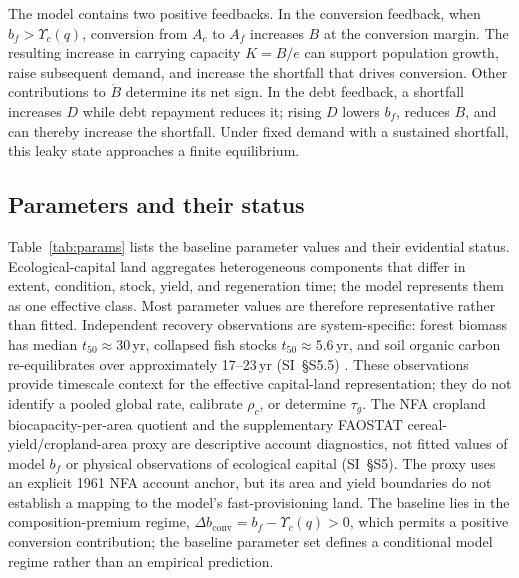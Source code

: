 \documentclass[preprint,12pt,authoryear]{elsarticle}
\newcommand{\dconv}{\Delta b_{\mathrm{conv}}}
\newcommand{\Ups}{\Upsilon_c}
\begin{document}
The model contains two positive feedbacks. In the conversion feedback, when $b_f>\Ups(q)$, conversion from $A_c$ to $A_f$ increases $B$ at the conversion margin. The resulting increase in carrying capacity $K=B/e$ can support population growth, raise subsequent demand, and increase the shortfall that drives conversion. Other contributions to $\dot B$ determine its net sign. In the debt feedback, a shortfall increases $D$ while debt repayment reduces it; rising $D$ lowers $b_f$, reduces $B$, and can thereby increase the shortfall. Under fixed demand with a sustained shortfall, this leaky state approaches a finite equilibrium.

\subsection{Parameters and their status}\label{sec:params}

Table~\ref{tab:params} lists the baseline parameter values and their evidential status. Ecological-capital land aggregates heterogeneous components that differ in extent, condition, stock, yield, and regeneration time; the model represents them as one effective class. Most parameter values are therefore representative rather than fitted. Independent recovery observations are system-specific: forest biomass has median $t_{50}\approx30$\,yr, collapsed fish stocks $t_{50}\approx5.6$\,yr, and soil organic carbon re-equilibrates over approximately 17--23\,yr (SI~\S S5.5) \citep{Poorter2016,HutchingsReynolds2004,Neubauer2013,Poeplau2011}. These observations provide timescale context for the effective capital-land representation; they do not identify a pooled global rate, calibrate $\rho_c$, or determine $\tau_g$. The NFA cropland biocapacity-per-area quotient and the supplementary FAOSTAT cereal-yield/cropland-area proxy are descriptive account diagnostics, not fitted values of model $b_f$ or physical observations of ecological capital (SI~\S S5). The proxy uses an explicit 1961 NFA account anchor, but its area and yield boundaries do not establish a mapping to the model's fast-provisioning land. The baseline lies in the composition-premium regime, $\dconv=b_f-\Ups(q)>0$, which permits a positive conversion contribution; the baseline parameter set defines a conditional model regime rather than an empirical prediction.
\end{document}
